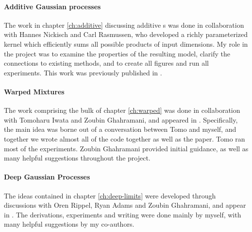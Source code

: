 \paragraph{Additive Gaussian processes}
The work in chapter \ref{ch:additive} discussing additive \gp{}s was done in collaboration with Hannes Nickisch and Carl Rasmussen, who developed a richly parameterized kernel which efficiently sums all possible products of input dimensions.
My role in the project was to examine the properties of the resulting model, clarify the connections to existing methods, and to create all figures and run all experiments.
This work was previously published in \citep{duvenaud2011additive11}.

\paragraph{Warped Mixtures}
The work comprising the bulk of chapter \ref{ch:warped} was done in collaboration with Tomoharu Iwata and Zoubin Ghahramani, and appeared in \citep{IwaDuvGha12}.
Specifically, the main idea was borne out of a conversation between Tomo and myself, and together we wrote almost all of the code together as well as the paper.
Tomo ran most of the experiments.
Zoubin Ghahramani provided initial guidance, as well as many helpful suggestions throughout the project.


\paragraph{Deep Gaussian Processes}
The ideas contained in chapter \ref{ch:deep-limits} were developed through discussions with Oren Rippel, Ryan Adams and Zoubin Ghahramani, and appear in \citep{DuvRipAdaGha14}.  The derivations, experiments and writing were done mainly by myself, with many helpful suggestions by my co-authors.

\outbpdocument{


}


